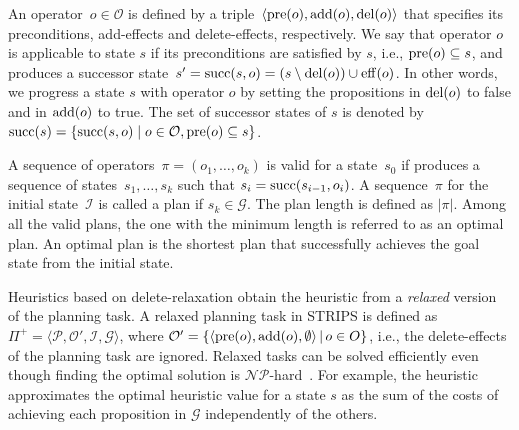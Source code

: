 \documentclass[ppgc,diss,english]{iiufrgs}
\begin{document}
An operator~$o \in \mathcal{O}$ is defined by a triple~$\langle\operatorname{pre}(o),\operatorname{add}(o),\operatorname{del}(o)\rangle$ that specifies its preconditions, add-effects and delete-effects, respectively. We say that operator $o$ is applicable to state $s$ if its preconditions are satisfied by $s$, i.e., $\operatorname{pre}(o) \subseteq s$, and produces a successor state~$s' = \operatorname{succ}(s,o) = (s \setminus \operatorname{del}(o)) \cup \operatorname{eff}(o)$. In other words, we progress a state $s$ with operator $o$ by setting the propositions in $\operatorname{del}(o)$ to false and in $\operatorname{add}(o)$ to true. The set of successor states of $s$ is denoted by~$\operatorname{succ}(s)=\{\operatorname{succ}(s,o)\mid o\in \mathcal{O}, \operatorname{pre}(o) \subseteq s\}$.

A sequence of operators~$\pi=(o_1,\ldots,o_k)$ is valid for a state~$s_0$ if produces a sequence of states~$s_1,\ldots,s_k$ such that $s_i=\operatorname{succ}(s_{i-1},o_i)$. A sequence~$\pi$ for the initial state~$\mathcal{I}$ is called a plan if $s_k \in \mathcal{G}$. The plan length is defined as $|\pi|$. Among all the valid plans, the one with the minimum length is referred to as an optimal plan. An optimal plan is the shortest plan that successfully achieves the goal state from the initial state.

Heuristics based on delete-relaxation obtain the heuristic from a \emph{relaxed} version of the planning task. A relaxed planning task in STRIPS is defined as $\Pi^{+}=\langle\mathcal{P},\mathcal{O'},\mathcal{I},\mathcal{G}\rangle$, where $\mathcal{O'} = \{ \langle \operatorname{pre}(o), \operatorname{add}(o), \emptyset \rangle \,|\, o \in O \}$, i.e., the delete-effects of the planning task are ignored. Relaxed tasks can be solved efficiently even though finding the optimal solution is $\mathcal{NP}$-hard~\cite{Bylander/1994}. For example, the heuristic \hadd approximates the optimal heuristic value for a state $s$ as the sum of the costs of achieving each proposition in $\mathcal{G}$ independently of the others.
\end{document}
